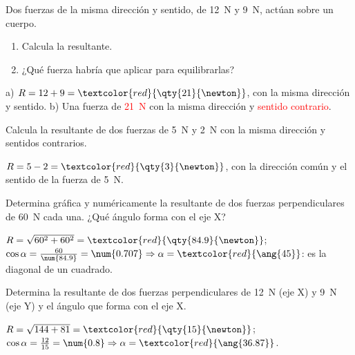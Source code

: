 \begin{exercise}
    Dos fuerzas de la misma dirección y sentido, de \qty{12}{\newton} y \qty{9}{\newton}, actúan sobre un cuerpo.
    \begin{enumerate}[label=\alph*)]
        \item Calcula la resultante.
        \item ¿Qué fuerza habría que aplicar para equilibrarlas?
    \end{enumerate}
    \begin{solu}
        a) \(R = 12 + 9 = \textcolor{red}{\qty{21}{\newton}}\), con la misma dirección y sentido. b) Una fuerza de \textcolor{red}{\qty{21}{\newton}} con la misma dirección y \textcolor{red}{sentido contrario}.
    \end{solu}
\end{exercise}

\begin{exercise}
    Calcula la resultante de dos fuerzas de \qty{5}{\newton} y \qty{2}{\newton} con la misma dirección y sentidos contrarios.
    \begin{solu}
        \(R = 5 - 2 = \textcolor{red}{\qty{3}{\newton}}\), con la dirección común y el sentido de la fuerza de \qty{5}{\newton}.
    \end{solu}
\end{exercise}

\begin{exercise}
    Determina gráfica y numéricamente la resultante de dos fuerzas perpendiculares de \qty{60}{\newton} cada una. ¿Qué ángulo forma con el eje X?
    \begin{solu}
        \(R = \sqrt{60^2 + 60^2} = \textcolor{red}{\qty{84.9}{\newton}}\); \(\cos\alpha = \frac{60}{\num{84.9}} = \num{0.707} \Rightarrow \alpha = \textcolor{red}{\ang{45}}\): es la diagonal de un cuadrado.
    \end{solu}
\end{exercise}

\begin{exercise}
    Determina la resultante de dos fuerzas perpendiculares de \qty{12}{\newton} (eje X) y \qty{9}{\newton} (eje Y) y el ángulo que forma con el eje X.
    \begin{solu}
        \(R = \sqrt{144 + 81} = \textcolor{red}{\qty{15}{\newton}}\); \(\cos\alpha = \frac{12}{15} = \num{0.8} \Rightarrow \alpha = \textcolor{red}{\ang{36.87}}\).
    \end{solu}
\end{exercise}

